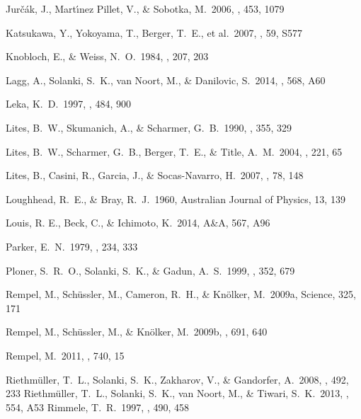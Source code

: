 \documentclass[preprint2]{aastex}
\begin{document}
\begin{thebibliography}{}
Jur{\v c}{\'a}k, J., Mart{\'{\i}}nez Pillet, V., \& Sobotka, M.\ 2006, \aap, 453, 1079

Katsukawa, Y., Yokoyama, T., Berger, T.~E., et al.\ 2007, \pasj, 59, S577

Knobloch, E., \& Weiss, N.~O.\ 1984, \mnras, 207, 203

 Lagg, A., Solanki, S.~K., van Noort, M., \& Danilovic, S.\ 2014, \aap, 568, A60

Leka, K.~D.\ 1997, \apj, 484, 900

 Lites, B.~W., Skumanich, A., \& Scharmer, G.~B.\ 1990, \apj, 355, 329

Lites, B.~W., Scharmer, G.~B., Berger, T.~E., \& Title, A.~M.\ 2004, \solphys, 221, 65

 Lites, B., Casini, R., Garcia, J., \& Socas-Navarro, H.\ 2007, \memsai, 78, 148

 Loughhead, R.~E., \& Bray, R.~J.\ 1960, Australian Journal of Physics, 13, 139

Louis, R. E., Beck, C., \& Ichimoto, K.\ 2014, A\&A, 567, A96

Parker, E.~N.\ 1979, \apj, 234, 333

Ploner, S.~R.~O., Solanki, S.~K., \& Gadun, A.~S.\ 1999, \aap, 352, 679 

Rempel, M., Sch{\"u}ssler, M., Cameron, R.~H., \& Kn{\"o}lker, M.\ 2009a, Science, 325, 171 

Rempel, M., Sch{\"u}ssler, M., \& Kn{\"o}lker, M.\ 2009b, \apj, 691, 640

Rempel, M.\ 2011, \apj, 740, 15 

Riethm{\"u}ller, T.~L., Solanki, S.~K., Zakharov, V., \& Gandorfer, A.\ 2008, \aap, 492, 233
 Riethm{\"u}ller, T.~L., Solanki, S.~K., van Noort, M., \& Tiwari, S.~K.\ 2013, \aap, 554, A53
 Rimmele, T.~R.\ 1997, \apj, 490, 458


\end{thebibliography}
\end{document}
